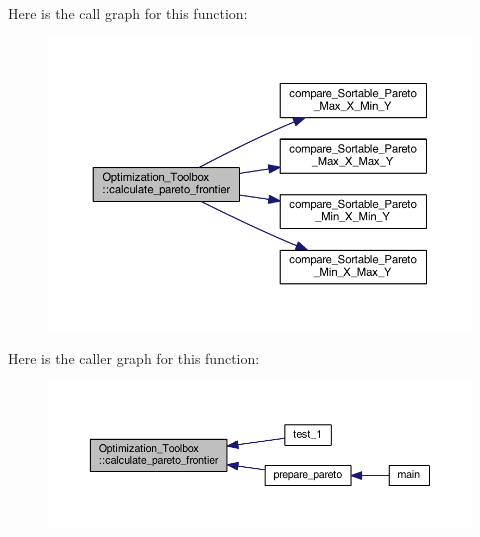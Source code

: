 Here is the call graph for this function\+:
\nopagebreak
\begin{figure}[H]
\begin{center}
\leavevmode
\includegraphics[width=350pt]{class_optimization___toolbox_acb0793203243d200d9154f2e98011d44_cgraph}
\end{center}
\end{figure}
Here is the caller graph for this function\+:
\nopagebreak
\begin{figure}[H]
\begin{center}
\leavevmode
\includegraphics[width=350pt]{class_optimization___toolbox_acb0793203243d200d9154f2e98011d44_icgraph}
\end{center}
\end{figure}
\mbox{\label{class_optimization___toolbox_a44f2c18904985dd9591efe0a63bfae9b}} 
